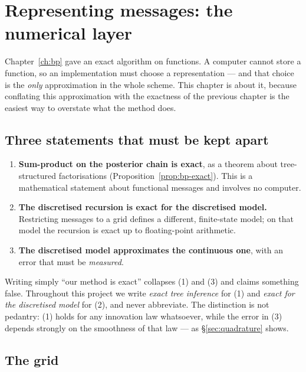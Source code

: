 \chapter{Representing messages: the numerical layer}
\label{ch:numerics}

Chapter~\ref{ch:bp} gave an exact algorithm on functions. A computer cannot store a function,
so an implementation must choose a representation --- and that choice is the \emph{only}
approximation in the whole scheme. This chapter is about it, because conflating this
approximation with the exactness of the previous chapter is the easiest way to overstate what
the method does.

\section{Three statements that must be kept apart}
\label{sec:three-statements}

\begin{enumerate}
\item \textbf{Sum-product on the posterior chain is exact}, as a theorem about tree-structured
factorisations (Proposition~\ref{prop:bp-exact}). This is a mathematical statement about
functional messages and involves no computer.
\item \textbf{The discretised recursion is exact for the discretised model.} Restricting
messages to a grid defines a different, finite-state model; on that model the recursion is
exact up to floating-point arithmetic.
\item \textbf{The discretised model approximates the continuous one}, with an error that must
be \emph{measured}.
\end{enumerate}

\begin{pitfall}
Writing simply ``our method is exact'' collapses (1) and (3) and claims something false.
Throughout this project we write \emph{exact tree inference} for (1) and \emph{exact for the
discretised model} for (2), and never abbreviate. The distinction is not pedantry: (1) holds
for any innovation law whatsoever, while the error in (3) depends strongly on the smoothness
of that law --- as \S\ref{sec:quadrature} shows.
\end{pitfall}

\section{The grid}

